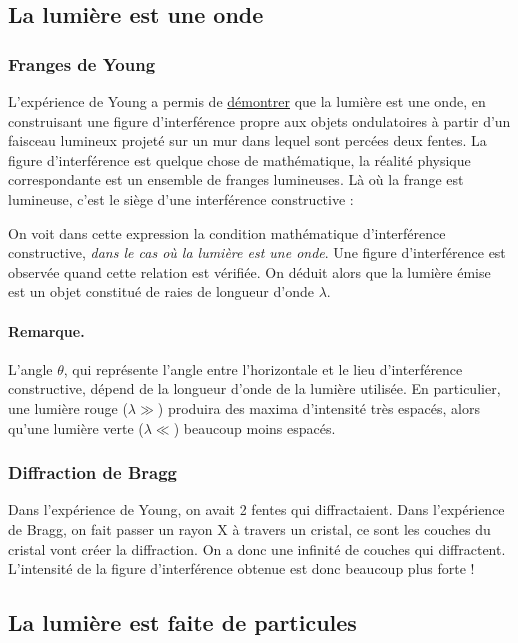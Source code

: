 \documentclass[11pt]{book}
\begin{document}
\subsection{La lumière est une onde}
\subsubsection{Franges de Young}
L'expérience de Young a permis de \underline{démontrer} que la lumière est une onde, en construisant une figure d'interférence propre aux objets ondulatoires à partir d'un faisceau lumineux projeté sur un mur dans lequel sont percées deux fentes. La figure d'interférence est quelque chose de mathématique, la réalité physique correspondante est un ensemble de franges lumineuses. Là où la frange est lumineuse, c'est le siège d'une interférence constructive :

On voit dans cette expression la condition mathématique d'interférence constructive, \textit{dans le cas où la lumière est une onde}. Une figure d'interférence est observée quand cette relation est vérifiée. On déduit alors que la lumière émise est un objet constitué de raies de longueur d'onde $\lambda$. 
\paragraph{Remarque.} L'angle $\theta$, qui représente l'angle entre l'horizontale et le lieu d'interférence constructive, dépend de la longueur d'onde de la lumière utilisée. En particulier, une lumière rouge ($\lambda \gg$) produira des maxima d'intensité très espacés, alors qu'une lumière verte ($\lambda \ll$) beaucoup moins espacés.
\subsubsection{Diffraction de Bragg}
Dans l'expérience de Young, on avait 2 fentes qui diffractaient. Dans l'expérience de Bragg, on fait passer un rayon X à travers un cristal, ce sont les couches du cristal vont créer la diffraction. On a donc une infinité de couches qui diffractent. L'intensité de la figure d'interférence obtenue est donc beaucoup plus forte !

\subsection{La lumière est faite de particules}
\end{document}
